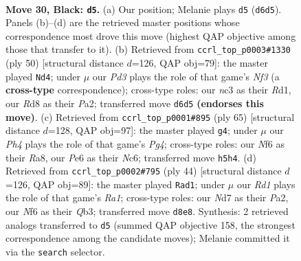 \documentclass[11pt]{article}
\begin{document}
\clearpage

\begin{figure}[p]\centering
\begin{subfigure}{0.46\textwidth}\centering
\resizebox{\linewidth}{!}{%
\newchessgame
\chessboard[
  setfen={3r2k1/3nq1p1/rp1ppn2/4p2p/P3P3/2N2NP1/2P2P1P/R1R1Q1K1 b - - 5 30},
  showmover=false,
  pgfstyle=straightmove, color=movearrow, markmove={d6-d5}
]}
\caption{}
\end{subfigure}\hfill
\begin{subfigure}{0.46\textwidth}\centering
\resizebox{\linewidth}{!}{%
\newchessgame
\chessboard[
  setfen={2r2nk1/2qr1ppp/pp1ppn2/8/2P1P3/1PNRQN2/P4PPP/3R2K1 w - - 8 26},
  showmover=false,
  pgfstyle=straightmove, color=movearrow, markmove={f3-d4}
]}
\caption{}
\end{subfigure}
\\[4pt]
\begin{subfigure}{0.46\textwidth}\centering
\resizebox{\linewidth}{!}{%
\newchessgame
\chessboard[
  setfen={r5k1/1q3p2/1pnprn2/2p3pp/P3P3/1NNQ1PPP/1P2R1K1/3R4 b - - 1 33},
  showmover=false,
  pgfstyle=straightmove, color=movearrow, markmove={g5-g4}
]}
\caption{}
\end{subfigure}\hfill
\begin{subfigure}{0.46\textwidth}\centering
\resizebox{\linewidth}{!}{%
\newchessgame
\chessboard[
  setfen={2r2rk1/pp1q2p1/4p2p/4Pn2/2Pp3P/1Q3N2/P2R1PP1/R5K1 w - - 0 23},
  showmover=false,
  pgfstyle=straightmove, color=movearrow, markmove={a1-d1}
]}
\caption{}
\end{subfigure}
\caption{\textbf{Move 30, Black: \texttt{d5}.} (a) Our position; Melanie plays \texttt{d5} (\texttt{d6d5}). Panels (b)--(d) are the retrieved master positions whose correspondence most drove this move (highest QAP objective among those that transfer to it). (b) Retrieved from \texttt{ccrl\_top\_p0003\#1330} (ply 50) [structural distance $d$=126, QAP obj=79]: the master played \texttt{Nd4}; under $\mu$ our \emph{Pd3} plays the role of that game's \emph{Nf3} (a \textbf{cross-type} correspondence); cross-type roles: our \emph{n}c3 as their \emph{R}d1, our \emph{R}d8 as their \emph{P}a2; transferred move \texttt{d6d5} \textbf{(endorses this move)}. (c) Retrieved from \texttt{ccrl\_top\_p0001\#895} (ply 65) [structural distance $d$=128, QAP obj=97]: the master played \texttt{g4}; under $\mu$ our \emph{Ph4} plays the role of that game's \emph{Pg4}; cross-type roles: our \emph{N}f6 as their \emph{R}a8, our \emph{P}e6 as their \emph{N}c6; transferred move \texttt{h5h4}. (d) Retrieved from \texttt{ccrl\_top\_p0002\#795} (ply 44) [structural distance $d$=126, QAP obj=89]: the master played \texttt{Rad1}; under $\mu$ our \emph{Rd1} plays the role of that game's \emph{Ra1}; cross-type roles: our \emph{N}d7 as their \emph{P}a2, our \emph{N}f6 as their \emph{Q}b3; transferred move \texttt{d8e8}. Synthesis: 2 retrieved analogs transferred to \texttt{d5} (summed QAP objective 158, the strongest correspondence among the candidate moves); Melanie committed it via the \texttt{search} selector.}
\label{fig:thought-m59}
\end{figure}
\end{document}
